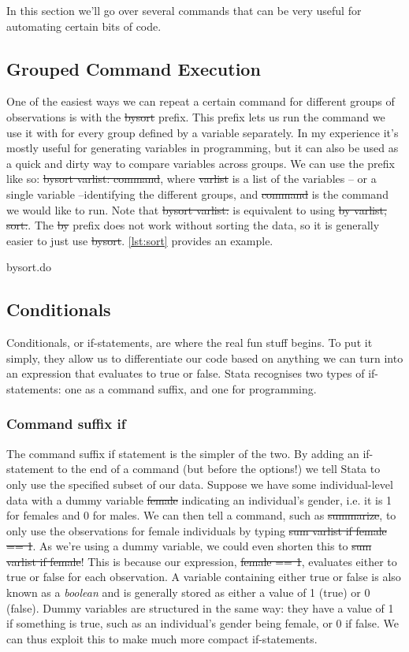 
In this section we'll go over several commands that can be very useful for automating certain bits of code.

\subsection{Grouped Command Execution}
One of the easiest ways we can repeat a certain command for different groups of observations is with the \st{bysort} prefix.
This prefix lets us run the command we use it with for every group defined by a variable separately.
In my experience it's mostly useful for generating variables in programming,
but it can also be used as a quick and dirty way to compare variables across groups.
We can use the prefix like so: \st{bysort varlist: command},
where \st{varlist} is a list of the variables -- or a single variable --identifying the different groups,
and \st{command} is the command we would like to run.
Note that \st{bysort varlist:} is equivalent to using \st{by varlist, sort:}.
The \st{by} prefix does not work without sorting the data, so it is generally easier to just use \st{bysort}.
\cref{lst:sort} provides an example.

\begin{listing}[htp]
\caption{bysort.do}\label{lst:sort}
\end{listing}

\subsection{Conditionals}
Conditionals, or if-statements, are where the real fun stuff begins.
To put it simply,
they allow us to differentiate our code based on anything we can turn into an expression that evaluates to true or false.
Stata recognises two types of if-statements: one as a command suffix,
and one for programming.

\subsubsection{Command suffix if}
The command suffix if statement is the simpler of the two.
By adding an if-statement to the end of a command (but before the options!) we tell Stata to only use the specified subset of our data.
Suppose we have some individual-level data with a dummy variable \st{female} indicating an individual's gender, i.e. it is 1 for females and 0 for males.
We can then tell a command, such as \st{summarize},
to only use the observations for female individuals by typing \st{sum varlist if female == 1}.
As we're using a dummy variable, we could even shorten this to \st{sum varlist if female}!
This is because our expression, \st{female == 1},
evaluates either to true or false for each observation.
A variable containing either true or false is also known as a \emph{boolean} and is generally stored as either a value of 1 (true) or 0 (false).
Dummy variables are structured in the same way:
they have a value of 1 if something is true,
such as an individual's gender being female,
or 0 if false.
We can thus exploit this to make much more compact if-statements.

